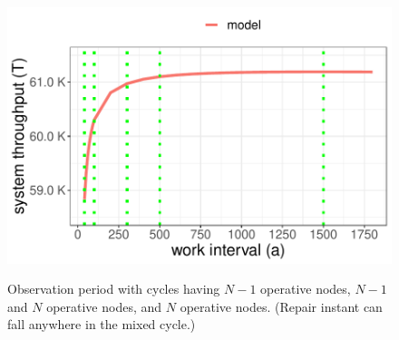 \begin{figure}
\begin{minipage}{.5\textwidth}
\begin{tikzpicture}[node distance=2cm,scale=0.65, every node/.style={transform shape}]
  \end{tikzpicture}
  \caption{Observation period with  cycles having $N-1$ operative nodes, $N-1$ and $N$ operative nodes, and $N$ operative nodes. (Repair instant can fall anywhere in the mixed cycle.)
  }
  \label{fig:cycles}
\end{minipage}%
\begin{minipage}{.5\textwidth}
  \centering
  \captionsetup{width=.9\linewidth}
  \includegraphics[width=\linewidth]{figures/fig-7.pdf}
  \label{fig:7} 
\end{minipage}
\end{figure}

